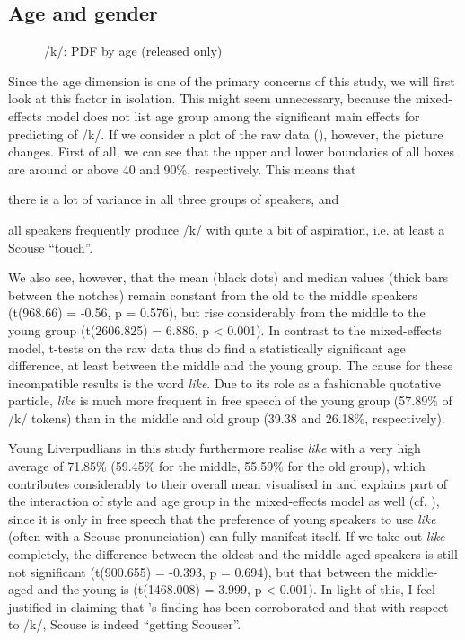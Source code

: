 \subsection{Age and gender}
\label{sec.prod.res.con.k.agegender}

\begin{figure}
	
		\resizebox{0.5\linewidth}{!}{} 
	\caption{/k/: PDF by age (released only)}
	\label{fig.box.k.tot}
\end{figure}

Since the age dimension is one of the primary concerns of this study, we will first look at this factor in isolation.
This might seem unnecessary, because the mixed-effects model does not list age group among the significant main effects for predicting  of /k/.
If we consider a plot of the raw data (), however, the picture changes.
First of all, we can see that the upper and lower boundaries of all boxes are around or above 40 and 90\%, respectively.
This means that
\begin{inparaenum}[(a)]
	\item there is a lot of variance in all three groups of speakers, and
	\item all speakers frequently produce /k/ with quite a bit of aspiration, i.e. at least a Scouse ``touch''.
\end{inparaenum}
We also see, however, that the mean (black dots) and median values (thick bars between the notches) remain constant from the old to the middle speakers (t(968.66) = -0.56, p = 0.576), but rise considerably from the middle to the young group (t(2606.825) = 6.886, p < 0.001).
In contrast to the mixed-effects model, t-tests on the raw data thus do find a statistically significant age difference, at least between the middle and the young group.
The cause for these incompatible results is the word \emph{like}.
Due to its role as a fashionable quotative particle, \emph{like} is much more frequent in free speech of the young group (57.89\% of /k/ tokens) than in the middle and old group (39.38 and 26.18\%, respectively).

Young Liverpudlians in this study furthermore realise \emph{like} with a very high average  of 71.85\% (59.45\% for the middle, 55.59\% for the old group), which contributes considerably to their overall mean visualised in  and explains part of the interaction of style and age group in the mixed-effects model as well (cf. ), since it is only in free speech that the preference of young speakers to use \emph{like} (often with a Scouse pronunciation) can fully manifest itself.
If we take out \emph{like} completely, the difference between the oldest and the middle-aged speakers is still not significant (t(900.655) = -0.393, p = 0.694), but that between the middle-aged and the young is (t(1468.008) = 3.999, p < 0.001).
In light of this, I feel justified in claiming that \citeauthor{watson2007a}'s \citeyearpar{watson2007a} finding has been corroborated and that with respect to /k/, Scouse is indeed ``getting Scouser''.

